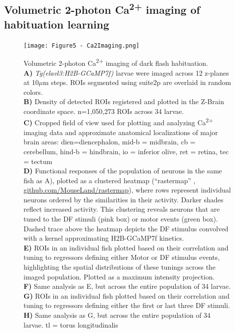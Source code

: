 \documentclass[9pt,lineno]{RandlettLab_elife}
\begin{document}
\subsection{Volumetric 2-photon Ca\textsuperscript{2+} imaging of habituation learning}

\begin{figure}
\begin{fullwidth}
\begin{center}
\texttt{[image: Figure5 - Ca2Imaging.png]}
\caption{
Volumetric 2-photon Ca\textsuperscript{2+} imaging of dark flash habituation.
\\ \textbf{A)} \textit{Tg(elavl3:H2B-GCaMP7f)} larvae were imaged across 12 z-planes at 10$\mu$m steps. ROIs segmented using suite2p \cite{Pachitariu2017-ad} are overlaid in random colors. 
\\ \textbf{B)} Density of detected ROIs registered and plotted in the Z-Brain coordinate space. n=1,050,273 ROIs across 34 larvae. 
\\ \textbf{C)} Cropped field of view used for  plotting and analyzing Ca\textsuperscript{2+} imaging data and approximate anatomical localizations of major brain areas: dien=diencephalon, mid-b = midbrain, cb = cerebellum, hind-b = hindbrain, io = inferior olive, ret = retina, tec = tectum
\\ \textbf{D)} Functional responses of the population of neurons in the same fish as A), plotted as a clustered heatmap (“rastermap” \cite{Pachitariu2017-ad}, \href{https://github.com/MouseLand/rastermap}{github.com/MouseLand/rastermap}), where rows represent individual neurons ordered by the similarities in their activity. Darker shades reflect increased activity. This clustering reveals neurons that are tuned to the DF stimuli (pink box) or motor events (green box). Dashed trace above the heatmap depicts the DF stimulus convolved with a kernel approximating H2B-GCaMP7f kinetics.
\\ \textbf{E)} ROIs in an individual fish plotted based on their correlation and tuning to regressors defining either Motor or DF stimulus events, highlighting the spatial distributions of these tunings across the imaged population. Plotted as a maximum intensity projection. 
\\ \textbf{F)} Same analysis as E, but across the entire population of 34 larvae. 
\\ \textbf{G)} ROIs in an individual fish plotted based on their correlation and tuning to regressors defining either the first or last three DF stimuli. 
\\ \textbf{H)} Same analysis as G, but across the entire population of 34 larvae. tl = torus longitudinalis
}
\end{center}
\end{fullwidth}
\end{figure}
\end{document}
